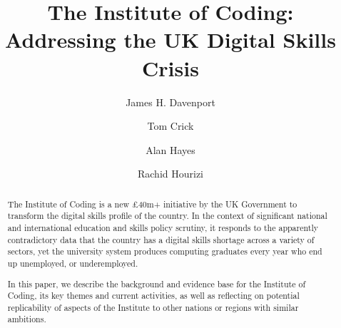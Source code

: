 \documentclass[sigconf]{acmart}
\begin{document}
\title{The Institute of Coding: Addressing the UK Digital Skills Crisis}
\author{James H. Davenport}

\author{Tom Crick}

\author{Alan Hayes}
\author{Rachid Hourizi}
 

\renewcommand{\shortauthors}{Davenport, Crick, Hayes and Hourizi}


\begin{abstract}
The Institute of Coding is a new \pounds40m+ initiative by the UK
Government to transform the digital skills profile of the country. In
the context of significant national and international education and
skills policy scrutiny, it responds to the apparently contradictory
data that the country has a digital skills shortage across a variety
of sectors, yet the university system produces computing
graduates every year who end up unemployed, or underemployed.
	


In this paper, we describe the background and evidence base for the
Institute of Coding, its key themes and current activities, as
well as reflecting on potential replicability of aspects of the
Institute to other nations or regions with similar ambitions.
\end{abstract}
\end{document}
